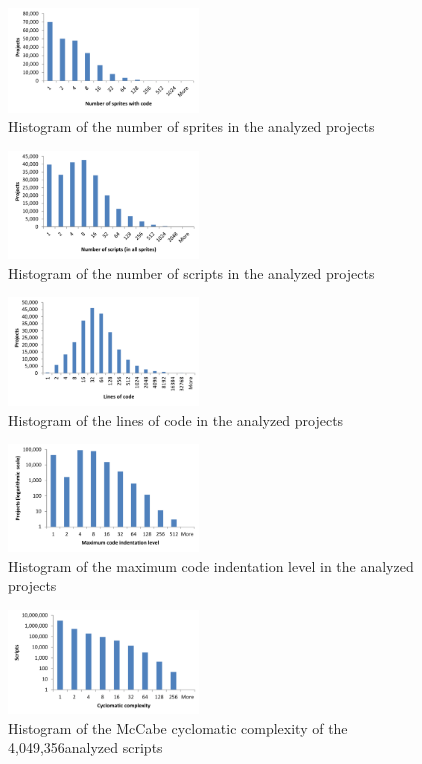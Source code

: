 \documentclass{sig-alternate}
\newcommand{\nscripts}{4,049,356}
\begin{document}
\begin{figure}
	\centering
	\includegraphics[width=0.45\textwidth]{fig/charts/1sprites}
	\caption{Histogram of the number of sprites in the analyzed projects}
	\label{fig:size-sprites}
\end{figure}
\begin{figure}
	\centering
	\includegraphics[width=0.45\textwidth]{fig/charts/1scripts}
	\caption{Histogram of the number of scripts in the analyzed projects}
	\label{fig:size-scripts}
\end{figure}
\begin{figure}
	\centering
	\includegraphics[width=0.45\textwidth]{fig/charts/1locs}
	\caption{Histogram of the lines of code in the analyzed projects}
	\label{fig:size-locs}
\end{figure}
\begin{figure}
	\centering
	\includegraphics[width=0.45\textwidth]{fig/charts/1indent}
	\caption{Histogram of the maximum code indentation level in the analyzed projects}
	\label{fig:size-indent}
\end{figure}
\begin{figure}
	\centering
	\includegraphics[width=0.45\textwidth]{fig/charts/3cyclomatic}
	\caption{Histogram of the McCabe cyclomatic complexity of the \nscripts analyzed scripts}
	\label{fig:cyclomatic}
\end{figure}
\end{document}
